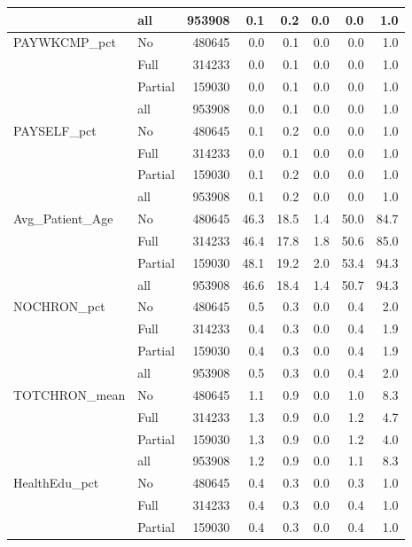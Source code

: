 \documentclass[11pt, oneside]{article}        %
\begin{document}
\begin{table}[ht]
{\begin{tabular}{llrrrrrr}
   \hline
 & all & 953908 &    0.1 &    0.2 & 0.0 &    0.0 &    1.0 \\ 
   \hline
PAYWKCMP\_pct & No & 480645 &    0.0 &    0.1 & 0.0 &    0.0 &    1.0 \\ 
   & Full & 314233 &    0.0 &    0.1 & 0.0 &    0.0 &    1.0 \\ 
   & Partial & 159030 &    0.0 &    0.1 & 0.0 &    0.0 &    1.0 \\ 
   \hline
 & all & 953908 &    0.0 &    0.1 & 0.0 &    0.0 &    1.0 \\ 
   \hline
PAYSELF\_pct & No & 480645 &    0.1 &    0.2 & 0.0 &    0.0 &    1.0 \\ 
   & Full & 314233 &    0.0 &    0.1 & 0.0 &    0.0 &    1.0 \\ 
   & Partial & 159030 &    0.1 &    0.2 & 0.0 &    0.0 &    1.0 \\ 
   \hline
 & all & 953908 &    0.1 &    0.2 & 0.0 &    0.0 &    1.0 \\ 
   \hline
Avg\_Patient\_Age & No & 480645 &   46.3 &   18.5 & 1.4 &   50.0 &   84.7 \\ 
   & Full & 314233 &   46.4 &   17.8 & 1.8 &   50.6 &   85.0 \\ 
   & Partial & 159030 &   48.1 &   19.2 & 2.0 &   53.4 &   94.3 \\ 
   \hline
 & all & 953908 &   46.6 &   18.4 & 1.4 &   50.7 &   94.3 \\ 
   \hline
NOCHRON\_pct & No & 480645 &    0.5 &    0.3 & 0.0 &    0.4 &    2.0 \\ 
   & Full & 314233 &    0.4 &    0.3 & 0.0 &    0.4 &    1.9 \\ 
   & Partial & 159030 &    0.4 &    0.3 & 0.0 &    0.4 &    1.9 \\ 
   \hline
 & all & 953908 &    0.5 &    0.3 & 0.0 &    0.4 &    2.0 \\ 
   \hline
TOTCHRON\_mean & No & 480645 &    1.1 &    0.9 & 0.0 &    1.0 &    8.3 \\ 
   & Full & 314233 &    1.3 &    0.9 & 0.0 &    1.2 &    4.7 \\ 
   & Partial & 159030 &    1.3 &    0.9 & 0.0 &    1.2 &    4.0 \\ 
   \hline
 & all & 953908 &    1.2 &    0.9 & 0.0 &    1.1 &    8.3 \\ 
   \hline
HealthEdu\_pct & No & 480645 &    0.4 &    0.3 & 0.0 &    0.3 &    1.0 \\ 
   & Full & 314233 &    0.4 &    0.3 & 0.0 &    0.4 &    1.0 \\ 
   & Partial & 159030 &    0.4 &    0.3 & 0.0 &    0.4 &    1.0 \\ 

\end{tabular}}
\end{table}
\end{document}
